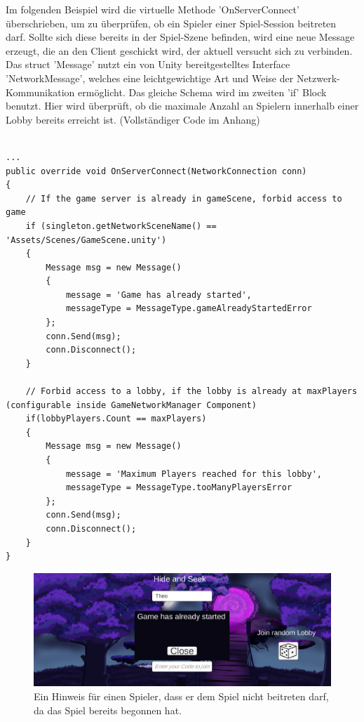 Im folgenden Beispiel wird die virtuelle Methode 'OnServerConnect' überschrieben, um zu überprüfen, ob ein Spieler einer Spiel-Session beitreten darf. Sollte sich diese bereits in der Spiel-Szene befinden, wird eine neue Message erzeugt, die an den Client geschickt wird, der aktuell versucht sich zu verbinden. Das struct 'Message' nutzt ein von Unity bereitgestelltes Interface 'NetworkMessage', welches eine leichtgewichtige Art und Weise der Netzwerk-Kommunikation ermöglicht. Das gleiche Schema wird im zweiten 'if' Block benutzt. Hier wird überprüft, ob die maximale Anzahl an Spielern innerhalb einer Lobby bereits erreicht ist. (Vollständiger Code im Anhang)

\begin{lstlisting}[caption= GameNetworkManager.cs OnServerConnect() und Message struct]

...	
public override void OnServerConnect(NetworkConnection conn)
{
	// If the game server is already in gameScene, forbid access to game
	if (singleton.getNetworkSceneName() == 'Assets/Scenes/GameScene.unity')
	{
		Message msg = new Message()
		{
			message = 'Game has already started',
			messageType = MessageType.gameAlreadyStartedError
		};
		conn.Send(msg);
		conn.Disconnect();
	}
	
	// Forbid access to a lobby, if the lobby is already at maxPlayers (configurable inside GameNetworkManager Component)
	if(lobbyPlayers.Count == maxPlayers)
	{
		Message msg = new Message()
		{
			message = 'Maximum Players reached for this lobby',
			messageType = MessageType.tooManyPlayersError
		};
		conn.Send(msg);
		conn.Disconnect();
	}
}
\end{lstlisting}

\begin{figure}[H]
	\centering
	\includegraphics[width=120mm]{images/prototyp_game_has_already_started.png}
	\caption[Game has already started]{Ein Hinweis für einen Spieler, dass er dem Spiel nicht beitreten darf, da das Spiel bereits begonnen hat.}
	\label{pic:prototyp_game_has_already_started}
\end{figure}

